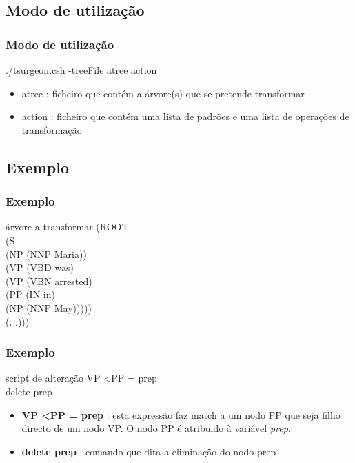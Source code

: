 \documentclass{beamer}
\begin{document}
\subsection{Modo de utilização}
\begin{frame}\frametitle{Modo de utilização}
\begin{block}{}
./tsurgeon.csh -treeFile atree action
\end{block}
\begin{itemize}
\item atree : ficheiro que contém a árvore(s) que se pretende transformar
\item action : ficheiro que contém uma lista de padrões e uma lista de operações de transformação  
\end{itemize}
\end{frame}

\subsection{Exemplo}
\begin{frame}\frametitle{Exemplo}
\begin{block}{árvore a transformar}
(ROOT\\
  (S\\
    (NP (NNP Maria))\\
    (VP (VBD was)\\
      (VP (VBN arrested)\\
        (PP (IN in)\\
          (NP (NNP May)))))\\
    (. .)))\\
\end{block}
\end{frame}

\begin{frame}\frametitle{Exemplo}
\begin{block}{script de alteração}
VP \textless  PP = prep\\
delete prep
\end{block}
\begin{itemize}
\item \textbf{VP \textless  PP = prep} : esta expressão faz match a um nodo PP que seja filho directo de um nodo VP. O nodo PP é atribuido à variável \textit{prep}.
\item \textbf{delete prep} : comando que dita a eliminação do nodo prep
\end{itemize}
\end{frame}
\end{document}
